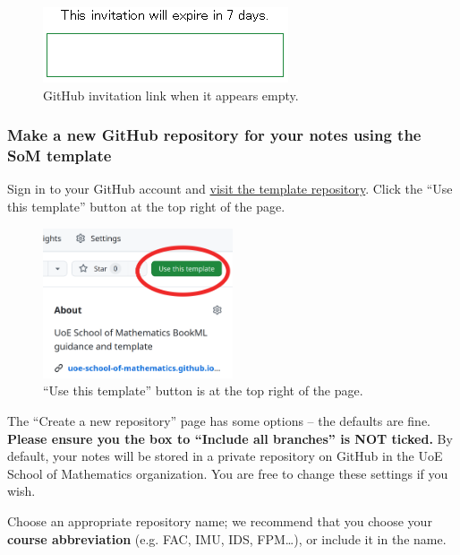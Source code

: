 \begin{figure}[h]
    \centering
    \includegraphics{img/GitHub-invitation.png}
    \caption{GitHub invitation link when it appears empty.}
    \label{fig:gh-invitation}
\end{figure}


\subsubsection{Make a new GitHub repository for your notes using the SoM template}

Sign in to your GitHub account and \href{https://github.com/UoE-School-of-Mathematics/BookML-Workflow-Template}{visit the template repository}.
Click the ``Use this template'' button at the top right of the page.

\begin{figure}[h]
    \centering
    \includegraphics[width=0.5\textwidth]{img/use_template.png}
    \caption{``Use this template'' button is at the top right of the page.}
    \label{fig:use-template}
\end{figure}

The ``Create a new repository'' page has some options -- the defaults are fine. \textbf{Please ensure you the box to ``Include all branches'' is NOT ticked.} By default, your notes will be stored in a private repository on GitHub in the UoE School of Mathematics organization. You are free to change these settings if you wish.

Choose an appropriate repository name; we recommend that you choose your \textbf{course abbreviation} (e.g. FAC, IMU, IDS, FPM\ldots), or include it in the name.

